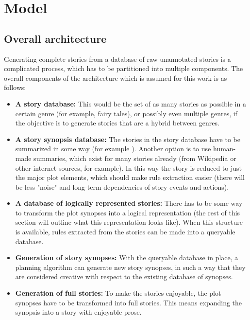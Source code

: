 \section{Model}

\subsection{Overall architecture}

Generating complete stories from a database of raw unannotated stories is a
complicated process, which has to be partitioned into multiple components.
The overall components of the architecture which is assumed for this work is as follows:
\begin{itemize}
\item \textbf{A story database:} This would be the set of as many stories
as possible in a certain genre (for example, fairy tales), or possibly even
multiple genres, if the objective is to generate stories that are a hybrid
between genres.
\item \textbf{A story synopsis database:} The stories in the story database have 
to be summarized in some way (for example \cite{salton1997automatic}). Another
option is to use human-made summaries, which exist for many stories already
(from Wikipedia or other internet sources, for example). In this way the story
is reduced to just the major plot elements, which should make rule extraction
easier (there will be less "noise" and long-term dependencies of story events and
actions).
\item \textbf{A database of logically represented stories:} There has to be some
way to transform the plot synopses into a logical representation (the rest of
this section will outline what this representation looks like). When this
structure is available, rules extracted from the stories can be made into a
queryable database.
\item \textbf{Generation of story synopses:} With the queryable database in place, a
planning algorithm can generate new story synopses, in such a way that they are
considered creative with respect to the existing database of synopses.
\item \textbf{Generation of full stories:} To make the stories enjoyable, the
plot synopses have to be transformed into full stories. This means expanding the
synopsis into a story with enjoyable prose.
\end{itemize}

